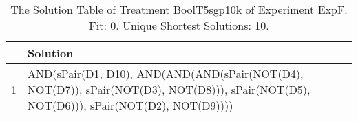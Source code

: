 \begin{table}[ht]
\centering
\begin{tabular}{rp{9cm}}
  \hline
 & Solution \\ 
  \hline
1 & AND(sPair(D1, D10), AND(AND(AND(sPair(NOT(D4), NOT(D7)), sPair(NOT(D3), NOT(D8))), sPair(NOT(D5), NOT(D6))), sPair(NOT(D2), NOT(D9)))) \\ 
   \hline
\end{tabular}
\caption{The Solution Table of Treatment BoolT5sgp10k of Experiment ExpF. Fit: 0. Unique Shortest Solutions: 10.} 
\end{table}
